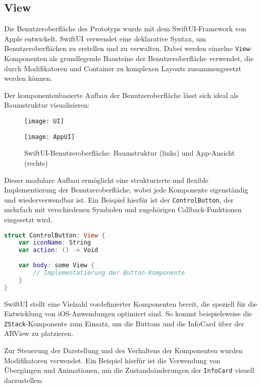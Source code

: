 \subsection{View}

Die Benutzeroberfläche des Prototyps wurde mit dem SwiftUI-Framework von Apple entwickelt. SwiftUI verwendet eine deklarative Syntax, um Benutzeroberflächen zu erstellen und zu verwalten. Dabei werden einzelne \texttt{View}-Komponenten als grundlegende Bausteine der Benutzeroberfläche verwendet, die durch Modifikatoren und Container zu komplexen Layouts zusammengesetzt werden können. \cite{appledevdoc}

Der komponentenbasierte Aufbau der Benutzeroberfläche lässt sich ideal als Baumstruktur visualisieren:

\begin{figure}[ht]
    \centering
    \begin{minipage}{0.45\textwidth}
        \centering
        \texttt{[image: UI]}
    \end{minipage}
    \hfill
    \begin{minipage}{0.45\textwidth}
        \centering
        \texttt{[image: AppUI]}
    \end{minipage}
    \caption{SwiftUI-Benutzeroberfläche: Baumstruktur (links) und App-Ansicht (rechts)}
    \label{fig:AppUI}
\end{figure}

Dieser modulare Aufbau ermöglicht eine strukturierte und flexible Implementierung der Benutzeroberfläche, wobei jede Komponente eigenständig und wiederverwendbar ist. Ein Beispiel hierfür ist der \texttt{ControlButton}, der mehrfach mit verschiedenen Symbolen und zugehörigen Callback-Funktionen eingesetzt wird.

\begin{lstlisting}[language=Swift]
struct ControlButton: View {
    var iconName: String
    var action: () -> Void
        
    var body: some View {
        // Implementatierung der Button-Komponente
    }
}
\end{lstlisting}

SwiftUI stellt eine Vielzahl vordefinierter Komponenten bereit, die speziell für die Entwicklung von iOS-Anwendungen optimiert sind. So kommt beispielsweise die \texttt{ZStack}-Komponente zum Einsatz, um die Buttons und die InfoCard über der ARView zu platzieren.

Zur Steuerung der Darstellung und des Verhaltens der Komponenten wurden Modifikatoren verwendet. Ein Beispiel hierfür ist die Verwendung von Übergängen und Animationen, um die Zustandsänderungen der \texttt{InfoCard} visuell darzustellen:

